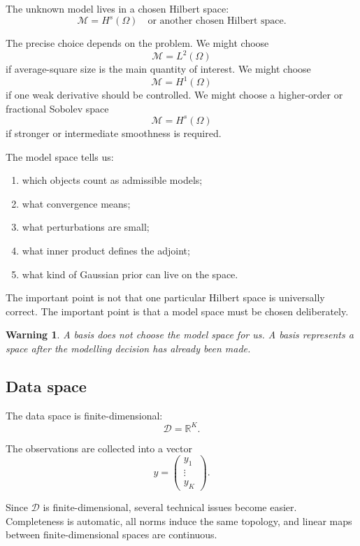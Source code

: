 \documentclass[11pt,a4paper]{book}
\newtheorem{warning}[definition]{Warning}
\newcommand{\M}{\mathcal{M}}      %
\newcommand{\D}{\mathcal{D}}      %
\newcommand{\R}{\mathbb{R}}
\newcommand{\obs}{y}
\begin{document}
The unknown model lives in a chosen Hilbert space:
\[
    \M = H^s(\Omega)
    \quad
    \text{or another chosen Hilbert space.}
\]

The precise choice depends on the problem. We might choose
\[
    \M=L^2(\Omega)
\]
if average-square size is the main quantity of interest. We might choose
\[
    \M=H^1(\Omega)
\]
if one weak derivative should be controlled. We might choose a higher-order or
fractional Sobolev space
\[
    \M=H^s(\Omega)
\]
if stronger or intermediate smoothness is required.

The model space tells us:
\begin{enumerate}[label=\arabic*.]
    \item which objects count as admissible models;
    \item what convergence means;
    \item what perturbations are small;
    \item what inner product defines the adjoint;
    \item what kind of Gaussian prior can live on the space.
\end{enumerate}

The important point is not that one particular Hilbert space is universally
correct. The important point is that a model space must be chosen deliberately.

\begin{warning}
A basis does not choose the model space for us. A basis represents a space after
the modelling decision has already been made.
\end{warning}

\subsection{Data space}

The data space is finite-dimensional:
\[
    \D = \R^K.
\]

The observations are collected into a vector
\[
    \obs =
    \begin{pmatrix}
        y_1\\
        \vdots\\
        y_K
    \end{pmatrix}.
\]

Since $\D$ is finite-dimensional, several technical issues become easier.
Completeness is automatic, all norms induce the same topology, and linear maps
between finite-dimensional spaces are continuous.
\end{document}
